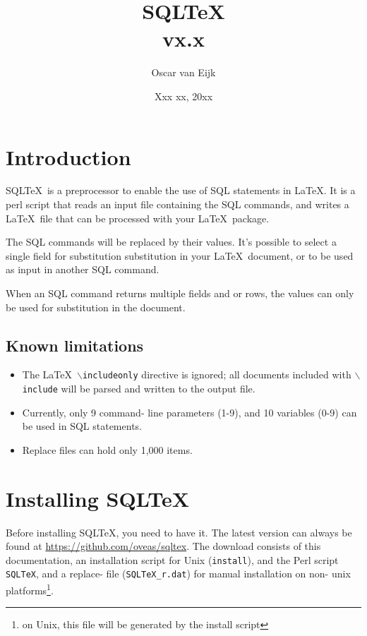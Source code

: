 \documentclass{article}
\newcommand{\bs}{\ensuremath{\backslash}}
\begin{document}
\title{SQL\TeX\\vx.x}
\date{Xxx xx, 20xx}
\author{Oscar van Eijk}
\maketitle
\hrulefill
\tableofcontents
\hrulefill

\section{Introduction}

SQL\TeX\ is a preprocessor to enable the use of SQL statements in \LaTeX. It is a perl script that reads
an input file containing the SQL commands, and writes a \LaTeX\ file that can be processed with your
\LaTeX\ package.

The SQL commands will be replaced by their values. It's possible to select a single field for substitution
substitution in your \LaTeX\ document, or to be used as input in another SQL command.

When an SQL command returns multiple fields and or rows, the values can only be used for substitution
in the document.

\subsection{Known limitations}

\begin{itemize}
\item The \LaTeX\ \texttt{\bs includeonly} directive is ignored; all documents included with \texttt{\bs include} will be parsed and written to the output file.
\item Currently, only 9 command- line parameters (1-9), and 10 variables (0-9) can be used in SQL statements.
\item Replace files can hold only 1,000 items.
\end{itemize}

\section{Installing SQL\TeX}

Before installing SQL\TeX, you need to have it. The latest version can always be found at
\url{https://github.com/oveas/sqltex}.
The download consists of this do\-cumentation, an installation script for Unix
(\texttt{install}), and the Perl script \texttt{SQLTeX}, and a replace- file (\texttt{SQLTeX\_r.dat}) for manual installation
on non- unix platforms\footnote{on Unix, this file will be generated by the install script}.
\end{document}
